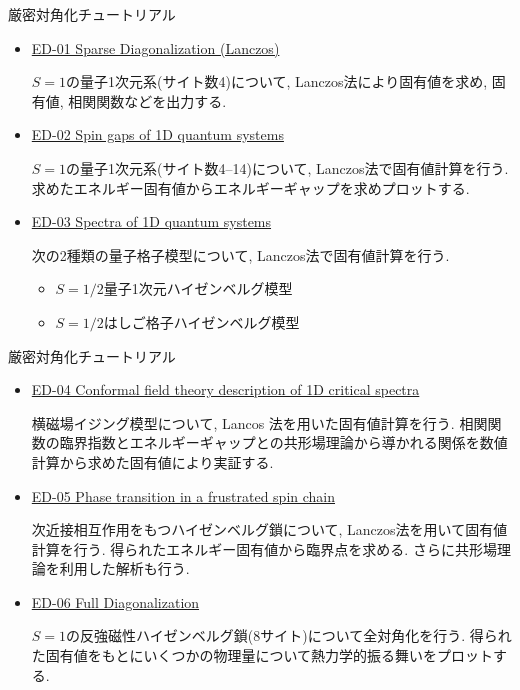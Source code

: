 \begin{frame}[t,fragile]{厳密対角化チュートリアル}
  \begin{itemize}
  \item \href{http://alps.comp-phys.org/mediawiki/index.php/ALPS_2_Tutorials:ED-01_SparseDiagonalization/ja}{ED-01 Sparse Diagonalization (Lanczos)
}

    $S=1$の量子1次元系(サイト数4)について, Lanczos法により固有値を求め, 固有値, 相関関数などを出力する.

  \item \href{http://alps.comp-phys.org/mediawiki/index.php/ALPS_2_Tutorials:ED-02_Gaps/ja}{ED-02 Spin gaps of 1D quantum systems}
    
    $S=1$の量子1次元系(サイト数4--14)について, Lanczos法で固有値計算を行う. 求めたエネルギー固有値からエネルギーギャップを求めプロットする.

  \item \href{http://alps.comp-phys.org/mediawiki/index.php/ALPS_2_Tutorials:ED-03_Spectra/ja}{ED-03 Spectra of 1D quantum systems}

    次の2種類の量子格子模型について, Lanczos法で固有値計算を行う.
    \begin{itemize}
      \item $S=1/2$量子1次元ハイゼンベルグ模型
      \item $S=1/2$はしご格子ハイゼンベルグ模型
    \end{itemize}
  \end{itemize}
\end{frame}

\begin{frame}[t,fragile]{厳密対角化チュートリアル}
  \begin{itemize}
  \item \href{http://alps.comp-phys.org/mediawiki/index.php/ALPS_2_Tutorials:ED-04_Criticality/ja}{ED-04 Conformal field theory description of 1D critical spectra}

    横磁場イジング模型について, Lancos 法を用いた固有値計算を行う. 相関関数の臨界指数とエネルギーギャップとの共形場理論から導かれる関係を数値計算から求めた固有値により実証する.

  \item \href{http://alps.comp-phys.org/mediawiki/index.php/ALPS_2_Tutorials:ED-05_ED_Phase_Transition/ja}{ED-05 Phase transition in a frustrated spin chain}

    次近接相互作用をもつハイゼンベルグ鎖について, Lanczos法を用いて固有値計算を行う. 得られたエネルギー固有値から臨界点を求める. さらに共形場理論を利用した解析も行う.

  \item \href{http://alps.comp-phys.org/mediawiki/index.php/ALPS_2_Tutorials:ED-06_FullDiagonalization/ja}{ED-06 Full Diagonalization}

    $S=1$の反強磁性ハイゼンベルグ鎖(8サイト)について全対角化を行う. 得られた固有値をもとにいくつかの物理量について熱力学的振る舞いをプロットする.
  \end{itemize}
\end{frame}

